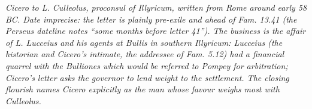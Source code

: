 
\textit{Cicero to L. Culleolus, proconsul of Illyricum, written
from Rome around early 58 BC. Date imprecise: the letter is
plainly pre-exile and ahead of \textit{Fam.} 13.41 (the
Perseus dateline notes ``some months before letter 41''). The
business is the affair of L. Lucceius and his agents at Bullis
in southern Illyricum: Lucceius (the historian and Cicero's
intimate, the addressee of \textit{Fam.} 5.12) had a financial
quarrel with the Bulliones which would be referred to Pompey
for arbitration; Cicero's letter asks the governor to lend
weight to the settlement. The closing flourish names Cicero
explicitly as the man whose favour weighs most with Culleolus.}
